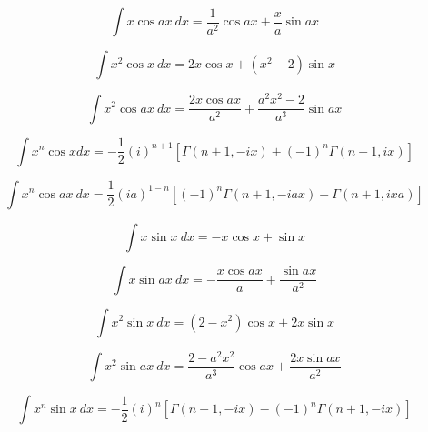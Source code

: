\documentclass[12pt,a4paper,leqno]{article}
\begin{document}
  \begin{equation}
  \int x \cos ax \ dx = \frac{1}{a^2} \cos ax + \frac{x}{a} \sin ax
  \end{equation}

  \begin{equation}
  \int x^2 \cos x \ dx = 2 x \cos x + \left ( x^2 - 2 \right ) \sin x
  \end{equation}

  \begin{equation}
  \int x^2 \cos ax \ dx = \frac{2 x \cos ax }{a^2} + \frac{ a^2 x^2 - 2  }{a^3} \sin ax
  \end{equation}

  \begin{equation}
  \int  x^n \cos x dx =
  -\frac{1}{2}(i)^{n+1}\left [ \Gamma(n+1, -ix)
  + (-1)^n \Gamma(n+1, ix)\right]
  \end{equation}

  \begin{equation}
  \int x^n \cos ax \ dx =
   \frac{1}{2}(ia)^{1-n}\left [ (-1)^n  \Gamma(n+1, -iax)
   -\Gamma(n+1, ixa)\right]
  \end{equation}

  \begin{equation}
  \int x \sin x\ dx = -x \cos x + \sin x
  \end{equation}

  \begin{equation}
  \int x \sin ax\ dx = -\frac{x \cos ax}{a} + \frac{\sin ax}{a^2}
  \end{equation}

  \begin{equation}
  \int x^2 \sin x\ dx = \left(2-x^2\right) \cos x + 2 x \sin x
  \end{equation}

  \begin{equation}
  \int x^2 \sin ax\ dx =\frac{2-a^2x^2}{a^3}\cos ax +\frac{ 2 x \sin ax}{a^2}
  \end{equation}

  \begin{equation}\label{eq:xul}
  \int x^n \sin x \ dx = -\frac{1}{2}(i)^n\left[ \Gamma(n+1, -ix)
   - (-1)^n\Gamma(n+1, -ix)\right]
  \end{equation}
\end{document}
